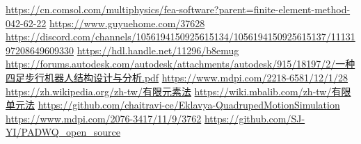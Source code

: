 \newpage
\renewcommand\bibname{參~考~文~獻}
\begin{thebibliography}{99}  %
\href{https://cn.comsol.com/multiphysics/fea-software?parent=finite-element-method-042-62-22}{https://cn.comsol.com/multiphysics/fea-software?parent=finite-element-method-042-62-22}
\href{https://www.guyuehome.com/37628}{https://www.guyuehome.com/37628}
\href{https://discord.com/channels/1056194150925615134/1056194150925615137/1113197208649609330}{https://discord.com/channels/1056194150925615134/1056194150925615137/1113197208649609330}
\href{https://hdl.handle.net/11296/b8emug}{https://hdl.handle.net/11296/b8emug}
\href{https://forums.autodesk.com/autodesk/attachments/autodesk/915/18197/2/一种四足步行机器人结构设计与分析.pdf}{https://forums.autodesk.com/autodesk/attachments/autodesk/915/18197/2/一种四足步行机器人结构设计与分析.pdf}
\href{https://www.mdpi.com/2218-6581/12/1/28}{https://www.mdpi.com/2218-6581/12/1/28}
\href{https://zh.wikipedia.org/zh-tw/有限元素法}{https://zh.wikipedia.org/zh-tw/有限元素法}
\href{https://wiki.mbalib.com/zh-tw/有限单元法}{https://wiki.mbalib.com/zh-tw/有限单元法}
\href{https://github.com/chaitravi-ce/Eklavya-QuadrupedMotionSimulation}{https://github.com/chaitravi-ce/Eklavya-QuadrupedMotionSimulation}
\href{https://www.mdpi.com/2076-3417/11/9/3762}{https://www.mdpi.com/2076-3417/11/9/3762}\label{Robot}
\href{https://github.com/SJ-YI/PADWQ_open_source}{https://github.com/SJ-YI/PADWQ_open_source}

%
\end{thebibliography}
\newpage
